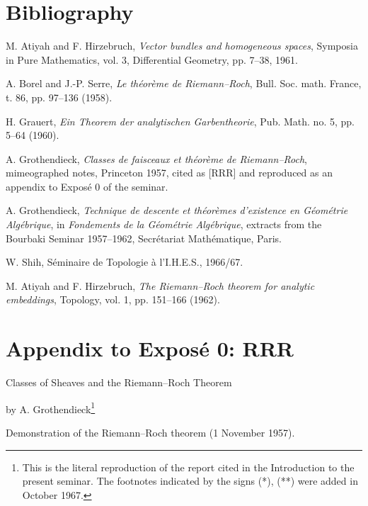 \section*{Bibliography}
\begin{enumerate}[label={[\arabic*]},leftmargin=2.5em]
\item M. Atiyah and F. Hirzebruch, \emph{Vector bundles and homogeneous spaces}, Symposia in Pure Mathematics, vol. 3, Differential Geometry, pp. 7--38, 1961.
\item A. Borel and J.-P. Serre, \emph{Le th\'eor\`eme de Riemann--Roch}, Bull. Soc. math. France, t. 86, pp. 97--136 (1958).
\item H. Grauert, \emph{Ein Theorem der analytischen Garbentheorie}, Pub. Math. no. 5, pp. 5--64 (1960).
\item A. Grothendieck, \emph{Classes de faisceaux et th\'eor\`eme de Riemann--Roch}, mimeographed notes, Princeton 1957, cited as [RRR] and reproduced as an appendix to Expos\'e 0 of the seminar.
\item A. Grothendieck, \emph{Technique de descente et th\'eor\`emes d'existence en G\'eom\'etrie Alg\'ebrique}, in \emph{Fondements de la G\'eom\'etrie Alg\'ebrique}, extracts from the Bourbaki Seminar 1957--1962, Secr\'etariat Math\'ematique, Paris.
\item W. Shih, S\'eminaire de Topologie \`a l'I.H.E.S., 1966/67.
\item M. Atiyah and F. Hirzebruch, \emph{The Riemann--Roch theorem for analytic embeddings}, Topology, vol. 1, pp. 151--166 (1962).
\end{enumerate}



\clearpage



\section*{Appendix to Exposé 0: RRR}
\begin{center}
{\Large Classes of Sheaves and the Riemann--Roch Theorem}\par
\vspace{0.5em}
by A. Grothendieck\footnote{This is the literal reproduction of the report cited in the Introduction to the present seminar. The footnotes indicated by the signs (*), (**) were added in October 1967.}
\end{center}

\begin{center}
Demonstration of the Riemann--Roch theorem (1 November 1957).
\end{center}

